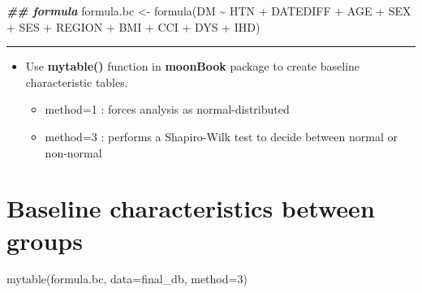 \documentclass[
]{book}
\newenvironment{Shaded}{\begin{snugshade}}{\end{snugshade}}
\newcommand{\AttributeTok}[1]{\textcolor[rgb]{0.77,0.63,0.00}{#1}}
\newcommand{\DecValTok}[1]{\textcolor[rgb]{0.00,0.00,0.81}{#1}}
\newcommand{\DocumentationTok}[1]{\textcolor[rgb]{0.56,0.35,0.01}{\textbf{\textit{#1}}}}
\newcommand{\FunctionTok}[1]{\textcolor[rgb]{0.00,0.00,0.00}{#1}}
\newcommand{\NormalTok}[1]{#1}
\newcommand{\OtherTok}[1]{\textcolor[rgb]{0.56,0.35,0.01}{#1}}
\newcommand{\SpecialCharTok}[1]{\textcolor[rgb]{0.00,0.00,0.00}{#1}}
\providecommand{\tightlist}{%
  \setlength{\itemsep}{0pt}\setlength{\parskip}{0pt}}
\begin{document}
\begin{Shaded}
\begin{Highlighting}[]
\DocumentationTok{\#\# formula}
\NormalTok{formula.bc }\OtherTok{\textless{}{-}} \FunctionTok{formula}\NormalTok{(DM }\SpecialCharTok{\textasciitilde{}}\NormalTok{ HTN }\SpecialCharTok{+}\NormalTok{ DATEDIFF }\SpecialCharTok{+}\NormalTok{ AGE }\SpecialCharTok{+}\NormalTok{ SEX }\SpecialCharTok{+}\NormalTok{ SES }\SpecialCharTok{+}\NormalTok{ REGION }\SpecialCharTok{+}\NormalTok{ BMI }\SpecialCharTok{+}\NormalTok{ CCI }\SpecialCharTok{+}\NormalTok{ DYS }\SpecialCharTok{+}\NormalTok{ IHD)}
\end{Highlighting}
\end{Shaded}

\begin{center}\rule{0.5\linewidth}{0.5pt}\end{center}

\begin{itemize}
\tightlist
\item
  Use \textbf{mytable()} function in \textbf{moonBook} package to create baseline characteristic tables.

  \begin{itemize}
  \tightlist
  \item
    method=1 : forces analysis as normal-distributed\\
  \item
    method=3 : performs a Shapiro-Wilk test to decide between normal or non-normal
  \end{itemize}
\end{itemize}

\hypertarget{baseline-characteristics-between-groups}{%
\section{Baseline characteristics between groups}\label{baseline-characteristics-between-groups}}

\begin{Shaded}
\begin{Highlighting}[]
\FunctionTok{mytable}\NormalTok{(formula.bc, }\AttributeTok{data=}\NormalTok{final\_db, }\AttributeTok{method=}\DecValTok{3}\NormalTok{) }
\end{Highlighting}
\end{Shaded}
\end{document}
